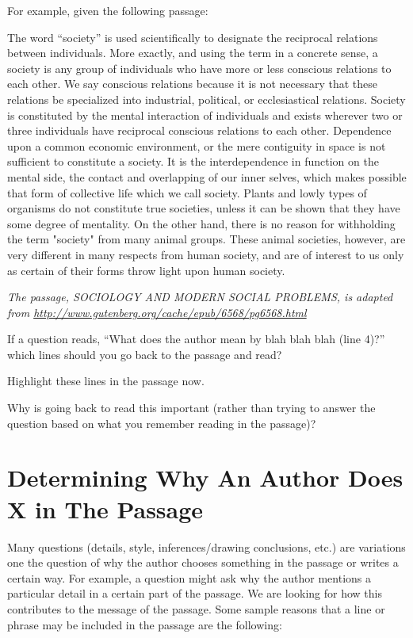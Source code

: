 \bigskip
For example, given the following passage:

\begin{linenumbers*}
\modulolinenumbers[5]
The word ``society'' is used scientifically to designate the reciprocal relations between individuals. More exactly, and using the term in a concrete sense, a society is any group of individuals who have more or less conscious relations to each other. We say conscious relations because it is not necessary that these relations be specialized into industrial, political, or ecclesiastical relations. Society is constituted by the mental interaction of individuals and exists wherever two or three individuals have reciprocal conscious relations to each other. Dependence upon a common economic environment, or the mere contiguity in space is not sufficient to constitute a society. It is the interdependence in function on the mental side, the contact and overlapping of our inner selves, which makes possible that form of collective life which we call society. Plants and lowly types of organisms do not constitute true societies, unless it can be shown that they have some degree of mentality. On the other hand, there is no reason for withholding the term "society" from many animal groups. These animal societies, however, are very different in many respects from human society, and are of interest to us only as certain of their forms throw light upon human society.
\end{linenumbers*}

\textit{\sloppy The passage, SOCIOLOGY AND MODERN SOCIAL PROBLEMS, is adapted from \url{http://www.gutenberg.org/cache/epub/6568/pg6568.html}}

\bigskip
If a question reads, ``What does the author mean by blah blah blah (line 4)?'' which lines should you go back to the passage and read? \hrulefill

\bigskip
Highlight these lines in the passage now. 

\bigskip
Why is going back to read this important (rather than trying to answer the question based on what you remember reading in the passage)? \hrulefill

\bigskip
\section{Determining Why An Author Does X in The Passage}

Many questions (details, style, inferences/drawing conclusions, etc.) are variations one the question of why the author chooses something in the passage or writes a certain way. For example, a question might ask why the author mentions a particular detail in a certain part of the passage. We are looking for how this contributes to the message of the passage. Some sample reasons that a line or phrase may be included in the passage are the following:

